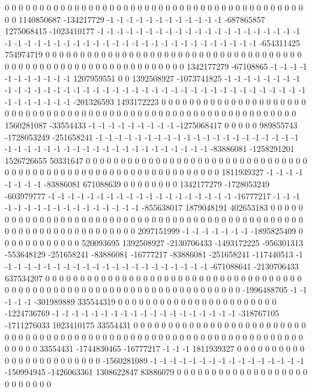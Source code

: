 0 0 0 0 0 0 0 0 0 0 0 0 0 0 0 0 0 0 0 0 0 0 0 0 0 0 0 0 0 0 0 0 0 0 0 0 0 0 0 0 0 0 0 0 0 1140850687 -134217729 -1 -1 -1 -1 -1 -1 -1 -1 -1 -1 -1 -1 -687865857 1275068415 -1023410177 -1 -1 -1 -1 -1 -1 -1 -1 -1 -1 -1 -1 -1 -1 -1 -1 -1 -1 -1 -1 -1 -1 -1 -1 -1 -1 -1 -1 -1 -1 -1 -1 -1 -1 -1 -1 -1 -1 -1 -1 -1 -1 -1 -1 -1 -1 -1 -654311425 754974719 0 0 0 0 0 0 0 0 0 0 0 0 0 0 0 0 0
0 0 0 0 0 0 0 0 0 0 0 0 0 0 0 0 0 0 0 0 0 0 0 0 0 0 0 0 0 0 0 0 0 0 0 0 0 0 0 0 0 0 0 0 0 0 1342177279 -67108865 -1 -1 -1 -1 -1 -1 -1 -1 -1 -1 -1 1207959551 0 0 1392508927 -1073741825 -1 -1 -1 -1 -1 -1 -1 -1 -1 -1 -1 -1 -1 -1 -1 -1 -1 -1 -1 -1 -1 -1 -1 -1 -1 -1 -1 -1 -1 -1 -1 -1 -1 -1 -1 -1 -1 -1 -1 -1 -1 -1 -1 -1 -1 -1 -201326593 1493172223 0 0 0 0 0 0 0 0 0 0 0 0 0 0 0 0
0 0 0 0 0 0 0 0 0 0 0 0 0 0 0 0 0 0 0 0 0 0 0 0 0 0 0 0 0 0 0 0 0 0 0 0 0 0 0 0 0 0 0 0 0 0 0 1560281087 -33554433 -1 -1 -1 -1 -1 -1 -1 -1 -1 -1275068417 0 0 0 0 0 989855743 -1728053249 -251658241 -1 -1 -1 -1 -1 -1 -1 -1 -1 -1 -1 -1 -1 -1 -1 -1 -1 -1 -1 -1 -1 -1 -1 -1 -1 -1 -1 -1 -1 -1 -1 -1 -1 -1 -1 -1 -1 -1 -1 -1 -1 -1 -83886081 -1258291201 1526726655 50331647 0 0 0 0 0 0 0 0 0 0 0 0 0 0 0
0 0 0 0 0 0 0 0 0 0 0 0 0 0 0 0 0 0 0 0 0 0 0 0 0 0 0 0 0 0 0 0 0 0 0 0 0 0 0 0 0 0 0 0 0 0 0 0 1811939327 -1 -1 -1 -1 -1 -1 -1 -1 -83886081 671088639 0 0 0 0 0 0 0 0 1342177279 -1728053249 -603979777 -1 -1 -1 -1 -1 -1 -1 -1 -1 -1 -1 -1 -1 -1 -1 -1 -1 -1 -1 -16777217 -1 -1 -1 -1 -1 -1 -1 -1 -1 -1 -1 -1 -1 -1 -1 -1 -1 -855638017 1879048191 402653183 0 0 0 0 0 0 0 0 0 0 0 0 0 0 0 0 0 0
0 0 0 0 0 0 0 0 0 0 0 0 0 0 0 0 0 0 0 0 0 0 0 0 0 0 0 0 0 0 0 0 0 0 0 0 0 0 0 0 0 0 0 0 0 0 0 0 0 2097151999 -1 -1 -1 -1 -1 -1 -1 -1895825409 0 0 0 0 0 0 0 0 0 0 0 0 520093695 1392508927 -2130706433 -1493172225 -956301313 -553648129 -251658241 -83886081 -16777217 -83886081 -251658241 -117440513 -1 -1 -1 -1 -1 -1 -1 -1 -1 -1 -1 -1 -1 -1 -1 -1 -1 -1 -1 -1 -1 -1 -671088641 -2130706433 637534207 0 0 0 0 0 0 0 0 0 0 0 0 0 0 0 0 0 0 0 0 0
0 0 0 0 0 0 0 0 0 0 0 0 0 0 0 0 0 0 0 0 0 0 0 0 0 0 0 0 0 0 0 0 0 0 0 0 0 0 0 0 0 0 0 0 0 0 0 0 0 0 -1996488705 -1 -1 -1 -1 -1 -301989889 335544319 0 0 0 0 0 0 0 0 0 0 0 0 0 0 0 0 0 0 0 0 0 0 0 -1224736769 -1 -1 -1 -1 -1 -1 -1 -1 -1 -1 -1 -1 -1 -1 -1 -1 -1 -1 -1 -318767105 -1711276033 1023410175 33554431 0 0 0 0 0 0 0 0 0 0 0 0 0 0 0 0 0 0 0 0 0 0 0
0 0 0 0 0 0 0 0 0 0 0 0 0 0 0 0 0 0 0 0 0 0 0 0 0 0 0 0 0 0 0 0 0 0 0 0 0 0 0 0 0 0 0 0 0 0 0 0 0 0 33554431 -1744830465 -16777217 -1 -1 -1 1811939327 0 0 0 0 0 0 0 0 0 0 0 0 0 0 0 0 0 0 0 0 0 0 0 0 -1560281089 -1 -1 -1 -1 -1 -1 -1 -1 -1 -1 -1 -1 -1 -1 -1 -1 -150994945 -1426063361 1308622847 83886079 0 0 0 0 0 0 0 0 0 0 0 0 0 0 0 0 0 0 0 0 0 0 0 0 0 0
